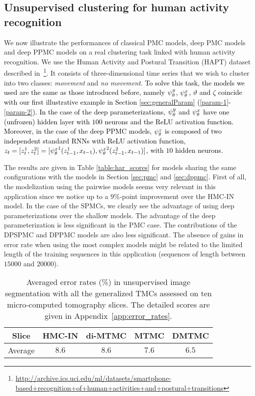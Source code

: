 \subsection{Unsupervised clustering for human activity recognition}
\label{sec:realworld_har}

We now illustrate the performances of classical PMC models, deep PMC models and deep PPMC 
models on a real clustering task linked with human activity recognition. We use the Human 
Activity and Postural Transition (HAPT) dataset described 
in~\citep{reyes2016transition}\footnote{\url{http://archive.ics.uci.edu/ml/datasets/smartphone-based+recognition+of+human+activities+and+postural+transitions}}. 
It consists of three-dimensional time series that we wish to cluster into 
two classes: \emph{movement} and \emph{no movement}. \textcolor{black}{To solve this task, the models we used are the same as those introduced before, namely $\psi^{y}_{\theta}$, $\psi^{x}_{\theta}$, $\vartheta$ and $\zeta$ coincide with our first illustrative example in Section \ref{sec:generalParam} (\eqref{param-1}-\eqref{param-2}). 
In the case of the deep parameterizations, $\psi^{y}_{\theta}$ and $\psi^{x}_{\theta}$ have one (unfrozen) hidden layer with $100$ neurons and
the ReLU activation function. Moreover, in the case of the deep PPMC models, $\psi^{z}_{\theta}$ is composed of two 
independent standard RNNs with ReLU activation function, \ie~
$z_t=[z_t^1,z_t^2]=[{\psi^{z}_{\theta}}^1(z_{t-1}^1,x_{t-1}),
{\psi^{z}_{\theta}}^2(z_{t-1}^2,x_{t-1})]$, with $10$ hidden neurons.}

The results are given in Table \ref{table:har_scores} for models sharing the same configurations with the models in Section \ref{sec:pmc} and \ref{sec:dppmc}. First of all, the modelization using the pairwise models seems very relevant in this application since we notice up to a $9\%$-point improvement over the HMC-IN model. In the case of the SPMCs, we clearly see the advantage of using deep parameterizations over the shallow models. The advantage of the deep parameterization is less significant in the PMC case. The contributions of the DPSPMC and DPPMC models are also less significant. The absence of gains in error rate when using the most complex models might be related to the limited length of the training sequences in this application (sequences of length between $15000$ and $20000$). 


\begin{table}
\centering
\setlength\tabcolsep{6pt}
\begin{tabular}{ccccc}
\toprule
Slice & HMC-IN & di-MTMC & MTMC & DMTMC \\\toprule
Average & $8.6$ & $8.6$ & $7.6$ & $\pmb{6.5}$\\
\bottomrule
\end{tabular}
\caption{Averaged error rates (\%) in unsupervised image 
segmentation with all the generalized TMCs assessed on ten micro-computed 
tomography slices. The detailed scores are given in Appendix~\ref{app:error_rates}.}
\label{table:microct_scores}
\end{table}

